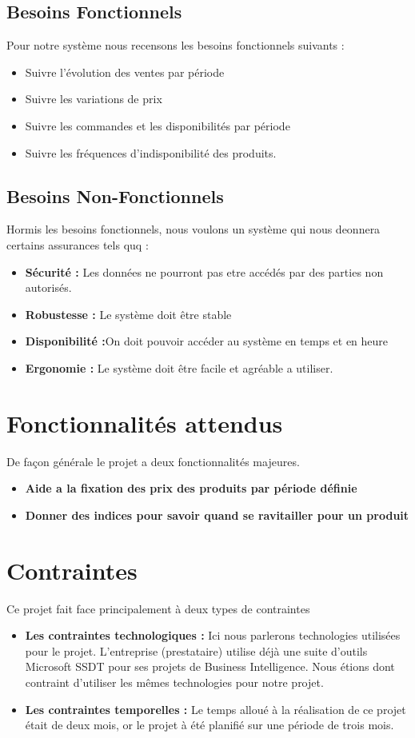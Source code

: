 \subsection{Besoins Fonctionnels}
Pour notre système nous recensons les besoins fonctionnels suivants :
\begin{itemize}
    \item Suivre l'évolution des ventes par période
    \item Suivre les variations de prix 
    \item Suivre les commandes et les disponibilités par période
    \item Suivre les fréquences d'indisponibilité des produits.
\end{itemize}
\subsection{Besoins Non-Fonctionnels}
Hormis les besoins fonctionnels, nous voulons un système qui nous deonnera certains assurances tels quq :
\begin{itemize}
    \item \textbf{Sécurité : }Les données ne pourront pas etre accédés par des parties non autorisés.
    \item \textbf{Robustesse : }Le système doit être stable 
    \item \textbf{Disponibilité :}On doit pouvoir accéder au système en temps et en heure
    \item \textbf{Ergonomie : }Le système doit être facile et agréable a utiliser.
\end{itemize}
\section{Fonctionnalités attendus}
De façon générale le projet a deux fonctionnalités majeures. 
\begin{itemize}
    \item \textbf{Aide a la fixation des prix des produits par période définie}
    \item \textbf{Donner des indices pour savoir quand se ravitailler pour un produit}
\end{itemize}


\section{Contraintes}
Ce projet fait face principalement à deux types de contraintes
\begin{itemize}
    \item \textbf{Les contraintes technologiques :} Ici nous parlerons technologies utilisées pour le projet. L'entreprise (prestataire) utilise déjà une suite d'outils Microsoft SSDT pour ses projets de Business Intelligence. Nous étions dont contraint d'utiliser les mêmes technologies pour notre projet.
    \item \textbf{Les contraintes temporelles :} Le temps alloué à la réalisation de ce projet était de deux mois, or le projet à été planifié sur une période de trois mois. 
\end{itemize}


